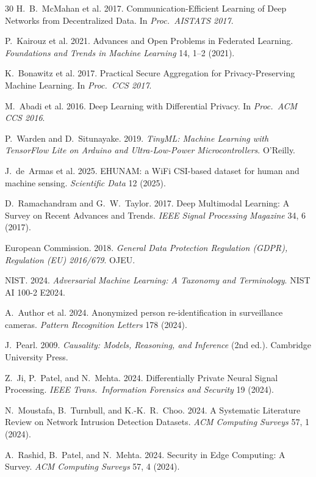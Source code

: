 \documentclass[sigconf,nonacm]{acmart}
\begin{document}
\begin{thebibliography}{30}
H.~B.~McMahan et al. 2017. Communication-Efficient Learning of Deep
Networks from Decentralized Data.
In \textit{Proc.\ AISTATS 2017}.

P.~Kairouz et al. 2021. Advances and Open Problems in Federated
Learning. \textit{Foundations and Trends in Machine Learning} 14,
1--2 (2021).

K.~Bonawitz et al. 2017. Practical Secure Aggregation for
Privacy-Preserving Machine Learning. In \textit{Proc.\ CCS 2017}.

M.~Abadi et al. 2016. Deep Learning with Differential Privacy.
In \textit{Proc.\ ACM CCS 2016}.

P.~Warden and D.~Situnayake. 2019.
\textit{TinyML: Machine Learning with TensorFlow Lite on Arduino
and Ultra-Low-Power Microcontrollers}. O'Reilly.

J.~de~Armas et al. 2025. EHUNAM: a WiFi CSI-based dataset for human
and machine sensing. \textit{Scientific Data} 12 (2025).

D.~Ramachandram and G.~W.~Taylor. 2017. Deep Multimodal Learning:
A Survey on Recent Advances and Trends.
\textit{IEEE Signal Processing Magazine} 34, 6 (2017).

European Commission. 2018. \textit{General Data Protection
Regulation (GDPR), Regulation (EU) 2016/679}. OJEU.

NIST. 2024. \textit{Adversarial Machine Learning: A Taxonomy and
Terminology}. NIST AI 100-2 E2024.

A.~Author et al. 2024. Anonymized person re-identification in
surveillance cameras. \textit{Pattern Recognition Letters} 178 (2024).

J.~Pearl. 2009. \textit{Causality: Models, Reasoning, and Inference}
(2nd ed.). Cambridge University Press.

Z.~Ji, P.~Patel, and N.~Mehta. 2024. Differentially Private
Neural Signal Processing.
\textit{IEEE Trans.\ Information Forensics and Security} 19 (2024).

N.~Moustafa, B.~Turnbull, and K.-K.~R.~Choo. 2024. A Systematic
Literature Review on Network Intrusion Detection Datasets.
\textit{ACM Computing Surveys} 57, 1 (2024).

A.~Rashid, B.~Patel, and N.~Mehta. 2024. Security in Edge
Computing: A Survey. \textit{ACM Computing Surveys} 57, 4 (2024).


\end{thebibliography}
\end{document}
